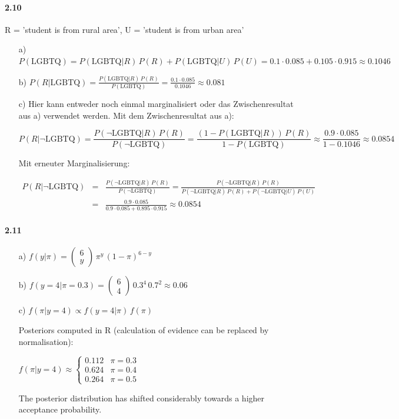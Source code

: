 \documentclass[fontsize=11pt,DIV=18,parskip=half]{scrartcl}
\begin{document}
\paragraph{2.10} R = 'student is from rural area', U = 'student is from urban area'

\begin{enumerate}
\item[a)] $P(\text{LGBTQ}) = P(\text{LGBTQ}|R)\,P(R) + P(\text{LGBTQ}|U)\,P(U) = 0.1 \cdot 0.085 + 0.105 \cdot 0.915 \approx 0.1046$
\item[b)] $\displaystyle{P(R|\text{LGBTQ}) = \frac{P(\text{LGBTQ}|R)\,P(R)}{P(\text{LGBTQ})} = \frac{0.1 \cdot 0.085}{0.1046} \approx 0.081}$
\item[c)] Hier kann entweder noch einmal marginalisiert oder das Zwischenresultat aus a) verwendet werden. Mit dem Zwischenresultat aus a):

\begin{equation*}
P(R|\neg \text{LGBTQ}) = \frac{P(\neg \text{LGBTQ}|R) \, P(R)}{P(\neg \text{LGBTQ})} = \frac{(1 - P(\text{LGBTQ}|R)) \, P(R)}{1-P(\text{LGBTQ})} \approx \frac{0.9\cdot0.085}{1-0.1046} \approx 0.0854
\end{equation*}

Mit erneuter Marginalisierung:

\begin{eqnarray*}
P(R|\neg \text{LGBTQ}) &=&  \frac{P(\neg \text{LGBTQ}|R)\,P(R)}{P(\neg \text{LGBTQ})} = \frac{P(\neg \text{LGBTQ}|R)\,P(R)}{P(\neg \text{LGBTQ}|R)\,P(R) + P(\neg \text{LGBTQ}|U)\,P(U)} \\
&=& \frac{0.9\cdot0.085}{0.9\cdot0.085 + 0.895\cdot0.915} \approx 0.0854
\end{eqnarray*}
\end{enumerate}

\paragraph{2.11}
\begin{enumerate}
\item[a)] $f(y|\pi) = \begin{pmatrix} 6 \\ y \end{pmatrix} \, \pi^y \, (1-\pi)^{6-y}$
\item[b)] $f(y=4|\pi=0.3) = \begin{pmatrix} 6 \\ 4 \end{pmatrix} \, 0.3^4 \, 0.7^2 \approx 0.06$
\item[c)] $f(\pi|y=4) \propto f(y=4|\pi)\, f(\pi)$

Posteriors computed in R (calculation of evidence can be replaced by normalisation):

$f(\pi|y=4) \approx \left\{ \begin{array}{ll}0.112 & \pi=0.3\\0.624 & \pi=0.4\\ 0.264 & \pi=0.5\end{array}\right.$ 

The posterior distribution has shifted considerably towards a higher acceptance probability.
\end{enumerate}
\end{document}
